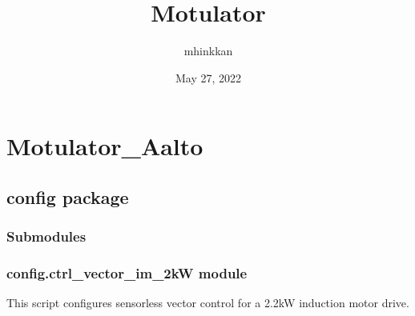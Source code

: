 \documentclass[letterpaper,10pt,english]{sphinxmanual}
\title{Motulator}
\date{May 27, 2022}
\author{mhinkkan}
\begin{document}
\pagestyle{empty}
\sphinxmaketitle
\pagestyle{plain}
\sphinxtableofcontents
\pagestyle{normal}
\label{\detokenize{index::doc}}


\sphinxstepscope


\chapter{Motulator\_Aalto}
\label{\detokenize{modules:motulator-aalto}}\label{\detokenize{modules::doc}}
\sphinxstepscope


\section{config package}
\label{\detokenize{config:config-package}}\label{\detokenize{config::doc}}

\subsection{Submodules}
\label{\detokenize{config:submodules}}

\subsection{config.ctrl\_vector\_im\_2kW module}
\label{\detokenize{config:module-config.ctrl_vector_im_2kW}}\label{\detokenize{config:config-ctrl-vector-im-2kw-module}}
\sphinxAtStartPar
This script configures sensorless vector control for a 2.2\sphinxhyphen{}kW induction motor
drive.
\end{document}
